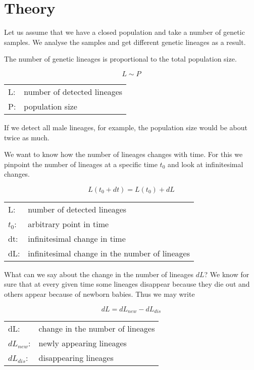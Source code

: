 \section{Theory}

Let us assume that we have a closed population and take a
number of genetic samples. We analyse the samples and get
different genetic lineages as a result.

The number of genetic lineages is proportional to the 
total population size.

\begin{equation}
L \sim P \label{lineages-population}
\end{equation}

\begin{tabular}{ll}
L:   & number of detected lineages\\
P:   & population size
\end{tabular}
\vspace{1em}

If we detect all male lineages, for example, the population
size would be about twice as much.

We want to know how the number of lineages changes with time.
For this we pinpoint the number of lineages at a specific
time $t_0$ and look at infinitesimal changes.

\begin{equation}
L(t_0 + dt) = L(t_0) + dL
\end{equation}

\begin{tabular}{ll}
L:     & number of detected lineages\\
$t_0$: & arbitrary point in time\\
dt:    & infinitesimal change in time\\
dL:    & infinitesimal change in the number of lineages
\end{tabular}
\vspace{1em}

What can we say about the change in the number of lineages
$dL$? We know for sure that at every given time some
lineages disappear because they die out and others appear
because of newborn babies. Thus we may write

\begin{equation}
dL = dL_{new} - dL_{dis}
\end{equation}

\begin{tabular}{ll}
dL:     & change in the number of lineages\\
$dL_{new}$: & newly appearing lineages\\
$dL_{dis}$: & disappearing lineages\\
\end{tabular}
\vspace{1em}


